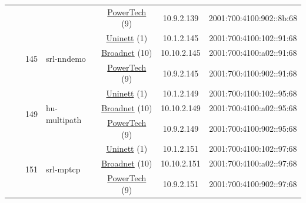 \begin{small}
\begin{center}
\begin{longtable}{|c|c|c|c|c|c|c|c|}
  &  &  &  & \multicolumn{2}{|c|}{\tiny{\href{http://www.powertech.no}{PowerTech} (9)}} & \tiny{10.9.2.139} & \tiny{2001:700:4100:902::8b:68} \\* \cline{3-3}\cline{4-4}\cline{5-5}\cline{6-6}\cline{7-7}\cline{8-8}
  &  & \multirow{3}{*}{\tiny{145}} & \multicolumn{1}{|l|}{\multirow{3}{*}{\tiny{srl-nndemo}}} & \multicolumn{2}{|c|}{\tiny{\href{https://www.uninett.no}{Uninett} (1)}} & \tiny{10.1.2.145} & \tiny{2001:700:4100:102::91:68} \\* \cline{5-5}\cline{6-6}\cline{7-7}\cline{8-8}
  &  &  &  & \multicolumn{2}{|c|}{\tiny{\href{https://www.broadnet.no}{Broadnet} (10)}} & \tiny{10.10.2.145} & \tiny{2001:700:4100:a02::91:68} \\* \cline{5-5}\cline{6-6}\cline{7-7}\cline{8-8}
  &  &  &  & \multicolumn{2}{|c|}{\tiny{\href{http://www.powertech.no}{PowerTech} (9)}} & \tiny{10.9.2.145} & \tiny{2001:700:4100:902::91:68} \\* \cline{3-3}\cline{4-4}\cline{5-5}\cline{6-6}\cline{7-7}\cline{8-8}
  &  & \multirow{3}{*}{\tiny{149}} & \multicolumn{1}{|l|}{\multirow{3}{*}{\tiny{hu-multipath}}} & \multicolumn{2}{|c|}{\tiny{\href{https://www.uninett.no}{Uninett} (1)}} & \tiny{10.1.2.149} & \tiny{2001:700:4100:102::95:68} \\* \cline{5-5}\cline{6-6}\cline{7-7}\cline{8-8}
  &  &  &  & \multicolumn{2}{|c|}{\tiny{\href{https://www.broadnet.no}{Broadnet} (10)}} & \tiny{10.10.2.149} & \tiny{2001:700:4100:a02::95:68} \\* \cline{5-5}\cline{6-6}\cline{7-7}\cline{8-8}
  &  &  &  & \multicolumn{2}{|c|}{\tiny{\href{http://www.powertech.no}{PowerTech} (9)}} & \tiny{10.9.2.149} & \tiny{2001:700:4100:902::95:68} \\* \cline{3-3}\cline{4-4}\cline{5-5}\cline{6-6}\cline{7-7}\cline{8-8}
  &  & \multirow{3}{*}{\tiny{151}} & \multicolumn{1}{|l|}{\multirow{3}{*}{\tiny{srl-mptcp}}} & \multicolumn{2}{|c|}{\tiny{\href{https://www.uninett.no}{Uninett} (1)}} & \tiny{10.1.2.151} & \tiny{2001:700:4100:102::97:68} \\* \cline{5-5}\cline{6-6}\cline{7-7}\cline{8-8}
  &  &  &  & \multicolumn{2}{|c|}{\tiny{\href{https://www.broadnet.no}{Broadnet} (10)}} & \tiny{10.10.2.151} & \tiny{2001:700:4100:a02::97:68} \\* \cline{5-5}\cline{6-6}\cline{7-7}\cline{8-8}
  &  &  &  & \multicolumn{2}{|c|}{\tiny{\href{http://www.powertech.no}{PowerTech} (9)}} & \tiny{10.9.2.151} & \tiny{2001:700:4100:902::97:68} \\* \cline{3-3}\cline{4-4}\cline{5-5}\cline{6-6}\cline{7-7}\cline{8-8}

\end{longtable}
\end{center}
\end{small}
